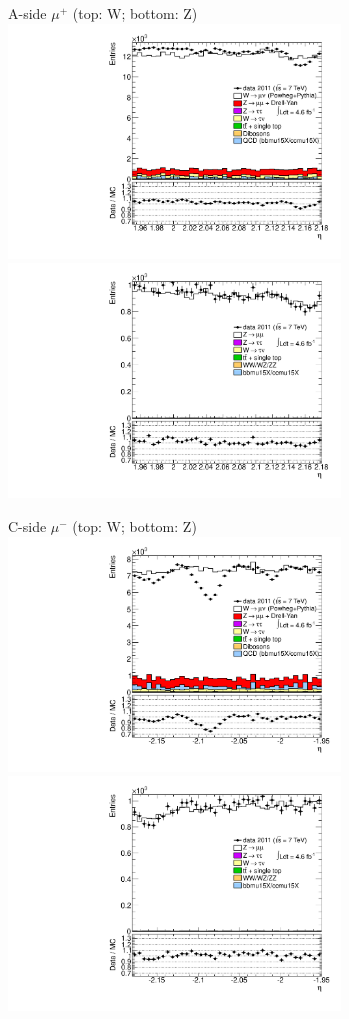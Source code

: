{{
A-side $\mu^{+}$ (top: W; bottom: Z)
\centering
\includegraphics[width=0.66\textwidth]{dates/20130306/figures/etaphi/W_10_A_stack_l_eta_POS} \\
\includegraphics[width=0.66\textwidth]{dates/20130306/figures/etaphi/Z_10_A_stack_lP_eta_ALL.pdf} 

\cole
}

 {
\colb[T]

C-side $\mu^{-}$ (top: W; bottom: Z)
\centering
\includegraphics[width=0.66\textwidth]{dates/20130306/figures/etaphi/W_10_C_stack_l_eta_NEG} \\
\includegraphics[width=0.66\textwidth]{dates/20130306/figures/etaphi/Z_10_C_stack_lN_eta_ALL.pdf}

}}
